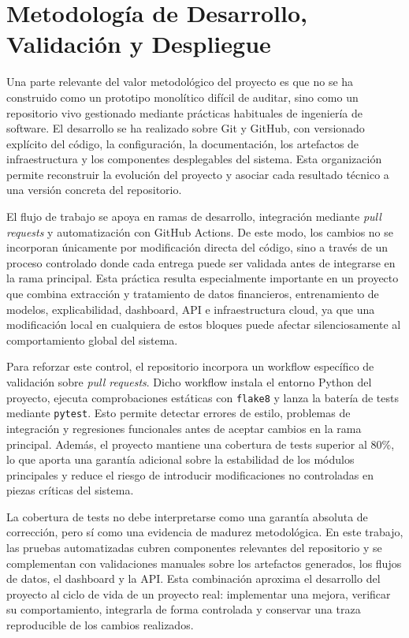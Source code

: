 
\chapter{Metodología de Desarrollo, Validación y Despliegue}
\label{app:workflow-dev}

Una parte relevante del valor metodológico del proyecto es que no se ha construido como un prototipo monolítico difícil de auditar, sino como un repositorio vivo gestionado mediante prácticas habituales de ingeniería de software. El desarrollo se ha realizado sobre Git y GitHub, con versionado explícito del código, la configuración, la documentación, los artefactos de infraestructura y los componentes desplegables del sistema. Esta organización permite reconstruir la evolución del proyecto y asociar cada resultado técnico a una versión concreta del repositorio.

El flujo de trabajo se apoya en ramas de desarrollo, integración mediante \emph{pull requests} y automatización con GitHub Actions. De este modo, los cambios no se incorporan únicamente por modificación directa del código, sino a través de un proceso controlado donde cada entrega puede ser validada antes de integrarse en la rama principal. Esta práctica resulta especialmente importante en un proyecto que combina extracción y tratamiento de datos financieros, entrenamiento de modelos, explicabilidad, dashboard, API e infraestructura cloud, ya que una modificación local en cualquiera de estos bloques puede afectar silenciosamente al comportamiento global del sistema.

Para reforzar este control, el repositorio incorpora un workflow específico de validación sobre \emph{pull requests}. Dicho workflow instala el entorno Python del proyecto, ejecuta comprobaciones estáticas con \texttt{flake8} y lanza la batería de tests mediante \texttt{pytest}. Esto permite detectar errores de estilo, problemas de integración y regresiones funcionales antes de aceptar cambios en la rama principal. Además, el proyecto mantiene una cobertura de tests superior al 80\%, lo que aporta una garantía adicional sobre la estabilidad de los módulos principales y reduce el riesgo de introducir modificaciones no controladas en piezas críticas del sistema.

La cobertura de tests no debe interpretarse como una garantía absoluta de corrección, pero sí como una evidencia de madurez metodológica. En este trabajo, las pruebas automatizadas cubren componentes relevantes del repositorio y se complementan con validaciones manuales sobre los artefactos generados, los flujos de datos, el dashboard y la API. Esta combinación aproxima el desarrollo del proyecto al ciclo de vida de un proyecto real: implementar una mejora, verificar su comportamiento, integrarla de forma controlada y conservar una traza reproducible de los cambios realizados.

